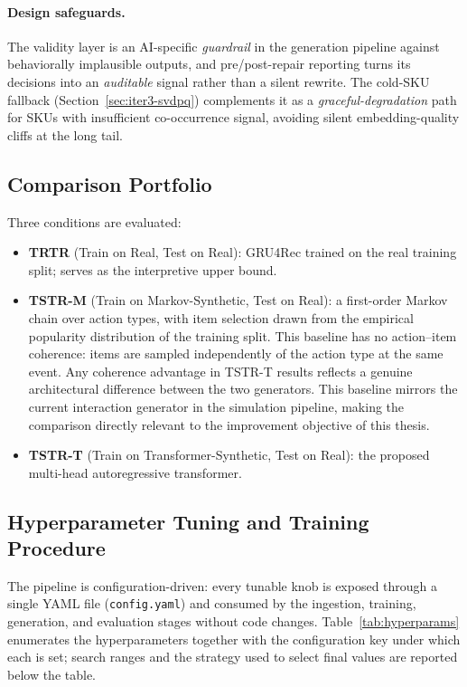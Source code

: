 \documentclass[sigconf,nonacm]{acmart}
\begin{document}
\paragraph{Design safeguards.}
The validity layer is an AI-specific \emph{guardrail} in the generation
pipeline against behaviorally implausible outputs, and pre/post-repair
reporting turns its decisions into an \emph{auditable} signal rather
than a silent rewrite. The cold-SKU fallback
(Section~\ref{sec:iter3-svdpq}) complements it as a
\emph{graceful-degradation} path for SKUs with insufficient
co-occurrence signal, avoiding silent embedding-quality cliffs at the
long tail.

\subsection{Comparison Portfolio}
\label{sec:portfolio}
Three conditions are evaluated:
\begin{itemize}[leftmargin=*]
  \item \textbf{TRTR} (Train on Real, Test on Real): GRU4Rec trained on the
    real training split; serves as the interpretive upper bound.
  \item \textbf{TSTR-M} (Train on Markov-Synthetic, Test on Real): a
    first-order Markov chain over action types, with item selection drawn
    from the empirical popularity distribution of the training split. This
    baseline has no action--item coherence: items are sampled independently
    of the action type at the same event. Any coherence advantage in TSTR-T
    results reflects a genuine architectural difference between the two
    generators. This baseline mirrors the current interaction generator in
    the simulation pipeline, making the comparison directly relevant to the
    improvement objective of this thesis.
  \item \textbf{TSTR-T} (Train on Transformer-Synthetic, Test on Real): the
    proposed multi-head autoregressive transformer.
\end{itemize}

\subsection{Hyperparameter Tuning and Training Procedure}
\label{sec:hparam}

The pipeline is configuration-driven: every tunable knob is exposed
through a single YAML file (\texttt{config.yaml}) and consumed by the
ingestion, training, generation, and evaluation stages without
code changes. Table~\ref{tab:hyperparams} enumerates the hyperparameters
together with the configuration key under which each is set; search
ranges and the strategy used to select final values are reported below
the table.
\end{document}

